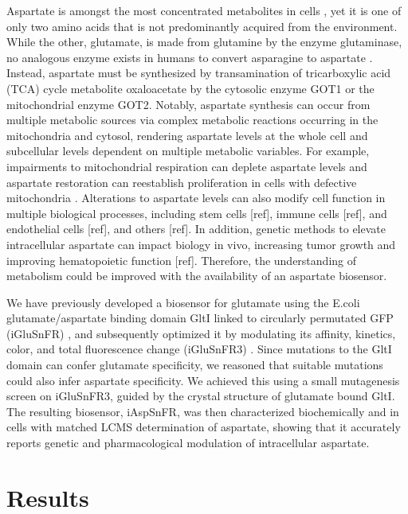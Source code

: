 \documentclass[9pt,lineno]{elife}
\begin{document}
Aspartate is amongst the most concentrated metabolites in cells \citep{Park2016-ap}, yet it is one of only two amino acids that is not predominantly acquired from the environment.
While the other, glutamate, is made from glutamine by the enzyme glutaminase, no analogous enzyme exists in humans to convert asparagine to aspartate \citep{Sullivan2018-gz}.
Instead, aspartate must be synthesized by transamination of tricarboxylic acid (TCA) cycle metabolite oxaloacetate by the cytosolic enzyme GOT1 or the mitochondrial enzyme GOT2.
Notably, aspartate synthesis can occur from multiple metabolic sources via complex metabolic reactions occurring in the mitochondria and cytosol, rendering aspartate levels at the whole cell and subcellular levels dependent on multiple metabolic variables.
For example, impairments to mitochondrial respiration can deplete aspartate levels and aspartate restoration can reestablish proliferation in cells with defective mitochondria \citep{Sullivan2015-xf, Birsoy2015-pg}.
Alterations to aspartate levels can also modify cell function in multiple biological processes, including stem cells [ref], immune cells [ref], and endothelial cells [ref], and others [ref].
In addition, genetic methods to elevate intracellular aspartate can impact biology in vivo, increasing tumor growth \citep{Sullivan2018-gz, Garcia-Bermudez2018-mj} and improving hematopoietic function [ref].
Therefore, the understanding of metabolism could be improved with the availability of an aspartate biosensor.

We have previously developed a biosensor for glutamate using the E.coli glutamate/aspartate binding domain GltI linked to circularly permutated GFP (iGluSnFR) \citep{Marvin2013-qq}, and subsequently optimized it by modulating its affinity, kinetics, color, and total fluorescence change (iGluSnFR3) \citep{Marvin2018-ks, Aggarwal2023-pi}.
Since mutations to the GltI domain can confer glutamate specificity, we reasoned that suitable mutations could also infer aspartate specificity.
We achieved this using a small mutagenesis screen on iGluSnFR3, guided by the crystal structure of glutamate bound GltI.
The resulting biosensor, iAspSnFR, was then characterized biochemically and in cells with matched LCMS determination of aspartate, showing that it accurately reports genetic and pharmacological modulation of intracellular aspartate.




\section{Results}
\end{document}
